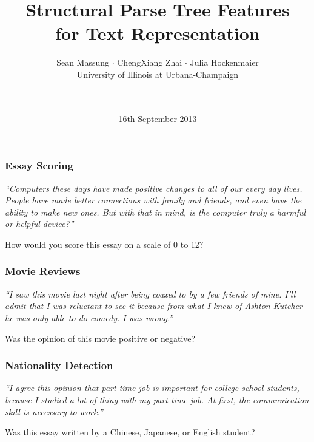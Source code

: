 \documentclass[handouti]{beamer}
\title[Structural Parse Tree Features for Text Representation]
{Structural Parse Tree Features \\ for Text Representation}
\author{Sean Massung $\cdot$ ChengXiang Zhai $\cdot$ Julia Hockenmaier \\
{\scriptsize University of Illinois at Urbana-Champaign}}
\date{~\\~\\16th September 2013}
\institute{~\\~\\ 7$^{th}$ International Conference on Computational Semantics
    \\ Irvine, California}
\begin{document}
\frame{\titlepage}
\Large %

\begin{frame}
    \frametitle{Essay Scoring}
    \emph{``Computers these days have made positive changes to all of our every
        day lives. People have made better connections with family and friends,
        and even have the ability to make new ones. But with that in mind, is
        the computer truly a harmful or helpful device?''}

        \vspace{.3in}
        \begin{center}
        {\normalsize How would you score this essay on a scale of 0 to 12?}
        \end{center}
\end{frame}

\begin{frame}
    \frametitle{Movie Reviews}
    \emph{``I saw this movie last night after being coaxed to by a few
        friends of mine. I'll admit that I was reluctant to see it because from
        what I knew of Ashton Kutcher he was only able to do comedy.  I was
    wrong.''}

        \vspace{.3in}
        \begin{center}
        {\normalsize Was the opinion of this movie positive or negative?}
        \end{center}
\end{frame}

\begin{frame}
    \frametitle{Nationality Detection}
    \emph{``I agree this opinion that part-time job is important for college
    school students, because I studied a lot of thing with my part-time job.
    At first, the communication skill is necessary to work.''}

        \vspace{.3in}
        \begin{center}
        {\normalsize Was this essay written by a Chinese, Japanese, or English
        student?}
        \end{center}
\end{frame}
\end{document}
